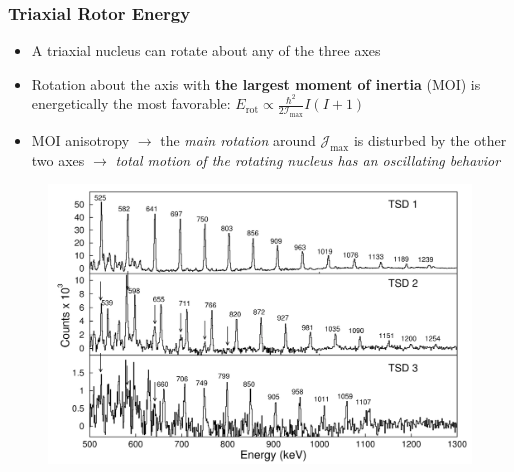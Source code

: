 \documentclass{beamer}
\begin{document}
\begin{frame}
  \frametitle{Triaxial Rotor Energy}
  \begin{itemize}
    \item A triaxial nucleus can rotate about any of the three axes
    \item Rotation about the axis with \textbf{the largest moment of inertia} (MOI) is energetically the most favorable: $E_\text{rot}\propto\frac{\hbar^2}{2\mathcal{I}_\text{max}}I(I+1 )$
    \item MOI anisotropy $\rightarrow$ the \emph{main rotation} around $\mathcal{J}_\text{max}$ is disturbed by the other two axes $\rightarrow$ {\color{red}\emph{total motion of the rotating nucleus has an oscillating behavior}}
  \end{itemize}
  \begin{figure}
    \centering
    \includegraphics[scale=0.09]{Figs/collective-spectra.pdf}

\end{figure}
\end{frame}
\end{document}
